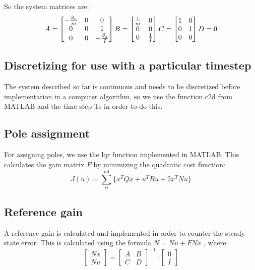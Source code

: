 So the system matrices are:
\[
A =\begin{bmatrix}
 -\frac{\beta_{x}}{m} & 0 & 0\\
 0 & 0 & 1\\
 0 & 0 & - \frac{\beta_{y}}{I}\\
\end{bmatrix}\\
B = \begin{bmatrix}
\frac{1}{m} & 0\\
0 & 0\\
0 & \frac{1}{I}\\
\end{bmatrix}\\
C = 
\begin{bmatrix}
1 & 0\\
0 & 1\\
0 & 0
\end{bmatrix}\\
D = 0
\]

\subsection{Discretizing for use with a particular timestep}

The system described so far is continuous and needs to be discretized before implementation in a computer algorithm, so we use the function c2d from MATLAB and the time step Ts in order to do this. 

\subsection{Pole assignment}

For assigning poles, we use the lqr function implemented in MATLAB. This calculates the gain matrix $ F $ by minimizing the quadratic cost function:
\[
J(u)=\sum_{0}^{\inf} \{x^{T}Qx+u^{T}Ru+2x^{T}Nu\}
\]


\subsection{Reference gain}

A reference gain is calculated and implemented in order to counter the steady state error. This is calculated using the formula $ N = Nu+FNx $ , where:
\[
\begin{bmatrix}
Nx\\
Nu
\end{bmatrix}
=
\begin{bmatrix}
A & B\\
C & D
\end{bmatrix}^{-1}
\!
\cdot
\begin{bmatrix}
0\\
I
\end{bmatrix}
\]
